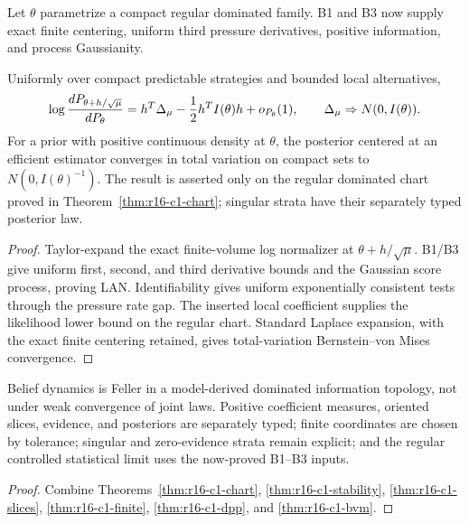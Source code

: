 Let \(\theta\) parametrize a compact regular dominated family.  B1 and B3 now
supply exact finite centering, uniform third pressure derivatives, positive
information, and process Gaussianity.

\begin{theorem}
\label{thm:r16-c1-bvm}
Uniformly over compact predictable strategies and bounded local alternatives,
\[
 \log {dP_{\theta+h/\sqrt\mu}\over dP_\theta}
 =h^T\Delta_\mu-{1\over2}h^TI(\theta)h+o_{P_\theta}(1),
 \qquad
 \Delta_\mu\Rightarrow N(0,I(\theta)).
\]
For a prior with positive continuous density at \(\theta\), the posterior
centered at an efficient estimator converges in total variation on compact
sets to \(N(0,I(\theta)^{-1})\).  The result is asserted only on the regular
dominated chart proved in Theorem~\ref{thm:r16-c1-chart}; singular strata have
their separately typed posterior law.
\end{theorem}

\begin{proof}
Taylor-expand the exact finite-volume log normalizer at
\(\theta+h/\sqrt\mu\).  B1/B3 give uniform first, second, and third derivative
bounds and the Gaussian score process, proving LAN.  Identifiability gives
uniform exponentially consistent tests through the pressure rate gap.  The
inserted local coefficient supplies the likelihood lower bound on the regular
chart.  Standard Laplace expansion, with the exact finite centering retained,
gives total-variation Bernstein--von Mises convergence.
\end{proof}

\begin{theorem}
\label{thm:r16-c1-main}
Belief dynamics is Feller in a model-derived dominated information topology,
not under weak convergence of joint laws.  Positive coefficient measures,
oriented slices, evidence, and posteriors are separately typed; finite
coordinates are chosen by tolerance; singular and zero-evidence strata remain
explicit; and the regular controlled statistical limit uses the now-proved
B1--B3 inputs.
\end{theorem}

\begin{proof}
Combine Theorems~\ref{thm:r16-c1-chart},
\ref{thm:r16-c1-stability}, \ref{thm:r16-c1-slices},
\ref{thm:r16-c1-finite}, \ref{thm:r16-c1-dpp}, and
\ref{thm:r16-c1-bvm}.
\end{proof}
